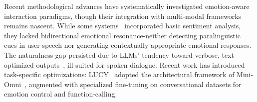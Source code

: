 \bigskip
\noindent Recent methodological advances have systematically investigated emotion-aware interaction paradigms, though their integration with multi-modal frameworks remains nascent. While some systems~\citep{wang2024freezeomnismartlowlatency} incorporated basic sentiment analysis, they lacked bidirectional emotional resonance-neither detecting paralinguistic cues in user speech nor generating contextually appropriate emotional responses. The naturalness gap persisted due to LLMs' tendency toward verbose, text-optimized outputs~\citep{fang2024llamaomniseamlessspeechinteraction}, ill-suited for spoken dialogue. Recent work has introduced task-specific optimizations: LUCY~\citep{gao2025lucylinguisticunderstandingcontrol} adopted the architectural framework of Mini-Omni~\citep{xie2024miniomnilanguagemodelshear}, augmented with specialized fine-tuning on conversational datasets for emotion control and function-calling.

